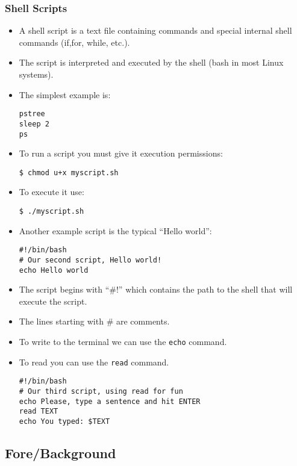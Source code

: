 \begin{frame}\frametitle{Shell Scripts}
\begin{itemize}
\item A shell script is a text file containing commands and special 
internal shell commands (if,for, while, etc.).
\item The script is interpreted and executed by the shell (bash in most Linux systems). 
\item The simplest example is:
\begin{lstlisting}[style=scriptStyle]
pstree
sleep 2
ps
\end{lstlisting}

\item To run a script you must give it execution permissions: 
\begin{lstlisting}
$ chmod u+x myscript.sh 
\end{lstlisting}
\item To execute it use: 
\begin{lstlisting}
$ ./myscript.sh
\end{lstlisting}
\framebreak
\item Another example script is the typical ``Hello world'': 
\begin{lstlisting}[style=scriptStyle]
#!/bin/bash
# Our second script, Hello world!
echo Hello world
\end{lstlisting}
\item The script begins with ``\#!'' which contains the path to the shell that will execute the script.
\item The lines starting with \# are comments.
\item To write to the terminal we can use the \texttt{echo} command.
\item To read you can use the \texttt{read} command.
\begin{lstlisting}[style=scriptStyle]
#!/bin/bash
# Our third script, using read for fun
echo Please, type a sentence and hit ENTER
read TEXT
echo You typed: $TEXT
\end{lstlisting}
\end{itemize}
\end{frame}

\subsection {Fore/Background}

